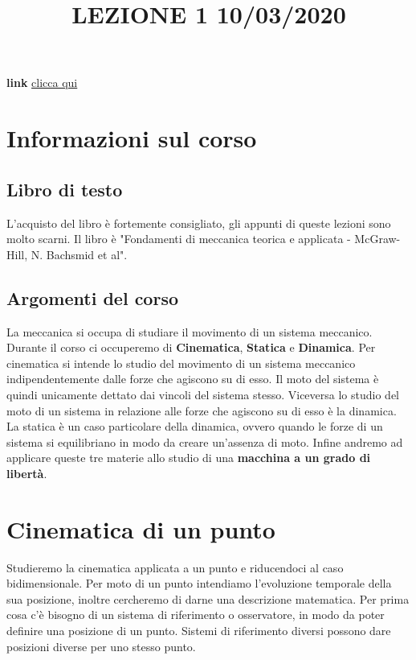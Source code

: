 \title{LEZIONE 1 10/03/2020}\newline
\textbf{link} \href{https://web.microsoftstream.com/video/58e86b29-c2c0-47d6-bbb4-f54861155460}{clicca qui}
\section{Informazioni sul corso}
\subsection{Libro di testo}
L'acquisto del libro è fortemente consigliato, gli appunti di queste lezioni sono molto scarni. Il libro è "Fondamenti di meccanica teorica e applicata - McGraw-Hill, N. Bachsmid et al".
\subsection{Argomenti del corso}
La meccanica si occupa di studiare il movimento di un sistema meccanico. Durante il corso ci occuperemo di \textbf{Cinematica}, \textbf{Statica} e \textbf{Dinamica}.\newline
Per cinematica si intende lo studio del movimento di un sistema meccanico indipendentemente dalle forze che agiscono su di esso. Il moto del sistema è quindi unicamente dettato dai vincoli del sistema stesso.\newline
Viceversa lo studio del moto di un sistema in relazione alle forze che agiscono su di esso è la dinamica.\newline
La statica è un caso particolare della dinamica, ovvero quando le forze di un sistema si equilibriano in modo da creare un'assenza di moto.\newline
Infine andremo ad applicare queste tre materie allo studio di una \textbf{macchina a un grado di libertà}.\newline
\section{Cinematica di un punto}
Studieremo la cinematica applicata a un punto e riducendoci al caso bidimensionale.\newline
Per moto di un punto intendiamo l'evoluzione temporale della sua posizione, inoltre cercheremo di darne una descrizione matematica.\newline
Per prima cosa c'è bisogno di un sistema di riferimento o osservatore, in modo da poter definire una posizione di un punto. Sistemi di riferimento diversi possono dare posizioni diverse per uno stesso punto.\newline
